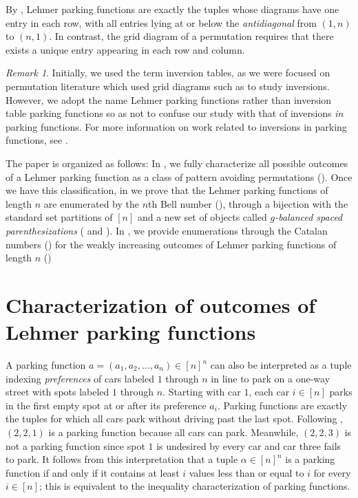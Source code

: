 \documentclass{amsart}
\newcommand{\seqnum}[1]{\href{http://oeis.org/#1}{\underline{#1}}}
\theoremstyle{definition}
\theoremstyle{definition}
\theoremstyle{remark}
\newtheorem*{remark}{Remark}
\begin{document}
\noindent By , Lehmer parking functions are exactly the tuples whose diagrams have one entry in each row, with all entries lying at or below the \textit{antidiagonal} from $(1,n)$ to $(n,1)$.
In contrast, the grid diagram of a permutation requires that there exists a unique entry appearing in each row and column.





\begin{remark}
    Initially, we used the term inversion tables, as we were focused on permutation literature which used grid diagrams such as  to study inversions. However, we adopt the name Lehmer parking functions rather than inversion table parking functions so as not to confuse our study with that of inversions \textit{in} parking functions. For more information on work related to inversions in parking functions, see \cite{celano2025inversionsparkingfunctions, celano2025statisticsellintervalparkingfunctions}.
\end{remark}

The paper is organized as follows: In , we fully characterize all possible outcomes of a Lehmer parking function as a class of pattern avoiding permutations (). Once we have this classification, in  we prove that the Lehmer parking functions of length $n$ are enumerated by the $n$th Bell number (\cite[\seqnum{A000110}]{OEIS}), through a bijection with the standard set partitions of $[n]$ and a new set of objects called \emph{$g$-balanced spaced parenthesizations} ( and ). In , we provide enumerations through the Catalan numbers (\cite[\seqnum{A000108}]{OEIS}) for the weakly increasing outcomes of Lehmer parking functions of length $n$ ()




\section{Characterization of outcomes of Lehmer parking functions}\label{sec:background on LPFs} 

A parking function $a=(a_1,a_2,\ldots,a_n)\in[n]^n$ can also be interpreted as a tuple indexing \textit{preferences} of cars labeled $1$ through $n$ in line to park on a one-way street with spots labeled $1$ through $n$. Starting with car $1$, each car $i\in[n]$ parks in the first empty spot at or after its preference $a_i$. Parking functions are exactly the tuples for which all cars park without driving past the last spot. Following , $(2,2,1)$ is a parking function because all cars can park. Meanwhile, $(2,2,3)$ is not a parking function since spot $1$ is undesired by every car and car three fails to park.
It follows from this interpretation that a tuple $\alpha\in[n]^n$ is a parking function if and only if it contains at least $i$ values less than or equal to $i$ for every $i\in[n]$; this is equivalent to the inequality characterization of parking functions.
\end{document}
